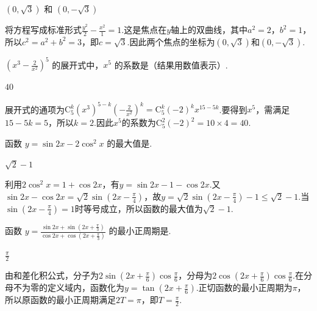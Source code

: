 \documentclass[UTF8,a4paper,oneside,11pt]{ctexbook}
\begin{document}
\begin{answer}
\((0,\sqrt{3})\) 和 \((0,-\sqrt{3})\)
\end{answer}

\begin{solution}
将方程写成标准形式\(\frac{y^2}{2}-\frac{x^2}{1}=1\).这是焦点在\(y\)轴上的双曲线，其中\(a^2=2\)，\(b^2=1\)，所以\(c^2=a^2+b^2=3\)，即\(c=\sqrt{3}\).因此两个焦点的坐标为\((0,\sqrt{3})\)和\((0,-\sqrt{3})\).
\end{solution}

\begin{problem}
\(\left(x^{3} - \frac{2}{x^{2}}\right)^{5}\) 的展开式中，\(x^{5}\) 的系数是（结果用数值表示）\fillinblank{}.
\end{problem}

\begin{answer}
\(40\)
\end{answer}

\begin{solution}
展开式的通项为\(\mathrm C_5^k(x^3)^{5-k}\left(-\frac{2}{x^2}\right)^k=\mathrm C_5^k(-2)^k x^{15-5k}\).要得到\(x^5\)，需满足\(15-5k=5\)，所以\(k=2\).因此\(x^5\)的系数为\(\mathrm C_5^2(-2)^2=10\times4=40\).
\end{solution}

\begin{problem}
函数 \(y = \sin 2x - 2\cos^2 x \) 的最大值是\fillinblank{}.
\end{problem}

\begin{answer}
\(\sqrt{2} - 1\)
\end{answer}

\begin{solution}
利用\(2\cos^2x=1+\cos2x\)，有\(y=\sin2x-1-\cos2x\).又\(\sin2x-\cos2x=\sqrt{2}\sin\left(2x-\frac{\pi}{4}\right)\)，故\(y=\sqrt{2}\sin\left(2x-\frac{\pi}{4}\right)-1\leqslant\sqrt{2}-1\).当\(\sin\left(2x-\frac{\pi}{4}\right)=1\)时等号成立，所以函数的最大值为\(\sqrt{2}-1\).
\end{solution}

\begin{problem}
函数 \(y = \frac{\sin 2x + \sin\left(2x + \frac{\pi}{3}\right)}{\cos 2x + \cos\left(2x + \frac{\pi}{3}\right)} \) 的最小正周期是\fillinblank{}.
\end{problem}

\begin{answer}
\(\frac{\pi}{2}\)
\end{answer}

\begin{solution}
由和差化积公式，分子为\(2\sin\left(2x+\frac{\pi}{6}\right)\cos\frac{\pi}{6}\)，分母为\(2\cos\left(2x+\frac{\pi}{6}\right)\cos\frac{\pi}{6}\).在分母不为零的定义域内，函数化为\(y=\tan\left(2x+\frac{\pi}{6}\right)\).正切函数的最小正周期为\(\pi\)，所以原函数的最小正周期满足\(2T=\pi\)，即\(T=\frac{\pi}{2}\).
\end{solution}
\end{document}
